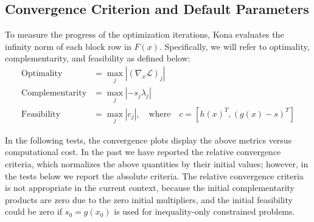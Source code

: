
\subsection{Convergence Criterion and Default Parameters}
To measure the progress of the optimization iterations, Kona evaluates the infinity
norm of each block row in $F(x)$. Specifically, we will refer to optimality,
complementarity, and feasibility as defined below:
\begin{align*}\label{eq:optfeas}
\text{Optimality} &= \max_{j} | (\nabla_x \mathcal{L})_j |   \\           %
\text{Complementarity} &= \max_{j} | -s_j \lambda_j |      \\            %
\text{Feasibility} &=  \max_{j} |   c_j     |  , \quad \text{where} \quad c = \left[ h(x)^T,  (g(x) - s)^T \right]         %
\end{align*}


In the following tests, the convergence plots display the above metrics versus
computational cost.  In the past we have reported the relative convergence criteria, which normalizes the above quantities by their initial values; however, in the tests below we report the absolute criteria.
The relative convergence criteria is not appropriate in the current context, because the
 initial complementarity products are zero due to the zero initial multipliers, 
 and the initial feasibility could be zero if $s_0 = g(x_0)$ is used for inequality-only constrained problems. 

